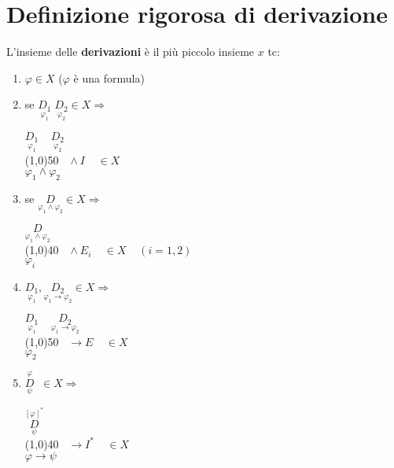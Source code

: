\documentclass{article}
\theoremstyle{break}
\theoremstyle{break}
\theoremstyle{break}
\theoremstyle{break}
\begin{document}
\section{Definizione rigorosa di derivazione}
L'insieme delle \textbf{derivazioni} è il più piccolo insieme \( x \) tc:
\begin{enumerate}
    \item \( \varphi \in X \) (\( \varphi \) è una formula)
    \item se \( \underset{\varphi_1}{D_1}\; \underset{\varphi_2}{D_2} \in X \Rightarrow \)
        \begin{center}
             \(
            \underset{\varphi_1}{D_1}\;\;\;\; \underset{\varphi_2}{D_2}
            \)\\
            \hspace{1.8cm}\line(1,0){50}\(\;\;\; \wedge I\;\;\;\; \in X\)\\  
             \( \varphi_1 \wedge \varphi_2 \)
        \end{center}
    \item se \( \underset{\varphi_1 \wedge \varphi_2}{D} \in X  \Rightarrow\)
        \begin{center}
             \(
            \underset{\varphi_1 \wedge \varphi_2}{D}
            \)\\
            \hspace{3.8cm}\line(1,0){40}\(\;\;\; \wedge E_i\;\;\;\; \in X\;\;\;\; (i = 1,2)\)\\  
             \( \varphi_i \)
        \end{center}

    \item \( \underset{\varphi_1}{D_1}, \underset{\varphi_1 \to \varphi_2}{D_2} \in X \Rightarrow \)
        \begin{center}
             \(
            \underset{\varphi_1}{D_1}\;\;\;\; \underset{\varphi_1 \to \varphi_2}{D_2}
            \)\\
            \hspace{2.1cm}\line(1,0){50}\(\;\;\; \to E\;\;\;\; \in X\)\\  
             \( \varphi_2 \)
        \end{center}

    \item \( \underset{\psi}{\stackrel{\varphi}{D}}\;\; \in X \Rightarrow \)
        \begin{center}
             \(
             \underset{\psi}{\stackrel{[\varphi]^*}{D}}
            \)\\
            \hspace{2.3cm}\line(1,0){40}\(\;\;\; \to I^*\;\;\;\; \in X\)\\  
             \( \varphi \to \psi \)
        \end{center}


\end{enumerate}
\end{document}
